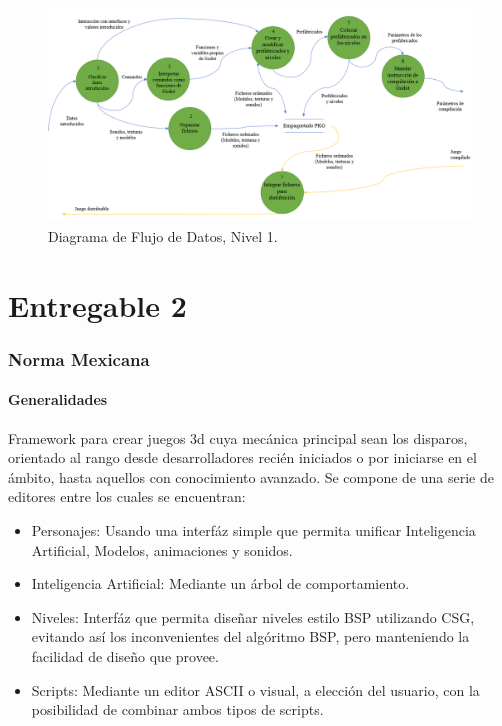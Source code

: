 \documentclass[]{article}
\begin{document}
\begin{figure}[H]
	
	\centering
	\includegraphics[width=1\textwidth]{DFD2}
	\caption{Diagrama de Flujo de Datos, Nivel 1.} 
	\label{DFD1}
	
\end{figure}




  



\newpage
\part{Entregable 2}
\section{Norma Mexicana}
\subsection{Generalidades}
Framework para crear juegos 3d cuya mec\'anica principal sean los disparos, orientado al rango desde desarrolladores reci\'en iniciados o por iniciarse en el \'ambito, hasta aquellos con conocimiento avanzado. Se compone de una serie de editores entre los cuales se encuentran:
\begin{itemize}
	\item Personajes: Usando una interf\'az simple que permita unificar Inteligencia Artificial, Modelos, animaciones y sonidos. 
	\item Inteligencia Artificial: Mediante un \'arbol de comportamiento.
	\item Niveles: Interf\'az que permita dise\~nar niveles estilo BSP utilizando CSG, evitando as\'i los inconvenientes del alg\'oritmo BSP, pero manteniendo la facilidad de dise\~no que provee. 
	\item Scripts: Mediante un editor ASCII o visual, a elecci\'on del usuario, con la posibilidad de combinar ambos tipos de scripts. 
	
\end{itemize}
\end{document}
